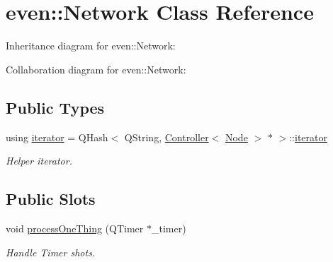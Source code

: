\hypertarget{classeven_1_1_network}{}\section{even\+:\+:Network Class Reference}
\label{classeven_1_1_network}


Inheritance diagram for even\+:\+:Network\+:


Collaboration diagram for even\+:\+:Network\+:
\subsection*{Public Types}
\begin{DoxyCompactItemize}
\item 
\mbox{\label{classeven_1_1_network_a4ebb4f8991f810b68f2b98107752e0f3}} 
using \mbox{\hyperlink{classeven_1_1_network_a4ebb4f8991f810b68f2b98107752e0f3}{iterator}} = Q\+Hash$<$ Q\+String, \mbox{\hyperlink{classeven_1_1_controller}{Controller}}$<$ \mbox{\hyperlink{classeven_1_1_node}{Node}} $>$ $\ast$ $>$\+::\mbox{\hyperlink{classeven_1_1_network_a4ebb4f8991f810b68f2b98107752e0f3}{iterator}}
\begin{DoxyCompactList}\small\item\em Helper iterator. \end{DoxyCompactList}\end{DoxyCompactItemize}
\subsection*{Public Slots}
\begin{DoxyCompactItemize}
\item 
\mbox{\label{classeven_1_1_network_abe2a5017de6b662a96400c3373501aec}} 
void \mbox{\hyperlink{classeven_1_1_network_abe2a5017de6b662a96400c3373501aec}{process\+One\+Thing}} (Q\+Timer $\ast$\+\_\+timer)
\begin{DoxyCompactList}\small\item\em Handle Timer shots. \end{DoxyCompactList}\end{DoxyCompactItemize}

